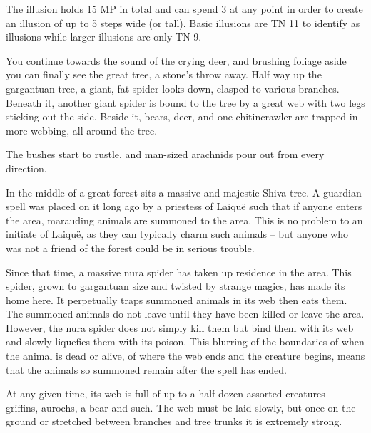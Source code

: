 \begin{multicols}{2}
The illusion holds 15 MP in total and can spend 3 at any point in order to create an illusion of up to 5 steps wide (or tall).
Basic illusions are TN 11 to identify as illusions while larger illusions are only TN 9.


\begin{boxtext}

  You continue towards the sound of the crying deer, and brushing foliage aside you can finally see the great tree, a stone's throw away.
  Half way up the gargantuan tree, a giant, fat spider looks down, clasped to various branches.
  Beneath it, another giant spider is bound to the tree by a great web with two legs sticking out the side.
  Beside it, bears, deer, and one chitincrawler are trapped in more webbing, all around the tree.

  The bushes start to rustle, and man-sized arachnids pour out from every direction.

\end{boxtext}

In the middle of a great forest sits a massive and majestic Shiva tree.
A guardian spell was placed on it long ago by a priestess of Laiqu\"{e} such that if anyone enters the area, marauding animals are summoned to the area.
This is no problem to an initiate of Laiqu\"{e}, as they can typically charm such animals -- but anyone who was not a friend of the forest could be in serious trouble.

Since that time, a massive nura spider has taken up residence in the area.  This spider, grown to gargantuan size and twisted by strange magics, has made its home here.  It perpetually traps summoned animals in its web then eats them.  The summoned animals do not leave until they have been killed or leave the area.  However, the nura spider does not simply kill them but bind them with its web and slowly liquefies them with its poison.  This blurring of the boundaries of when the animal is dead or alive, of where the web ends and the creature begins, means that the animals so summoned remain after the spell has ended.

At any given time, its web is full of up to a half dozen assorted creatures -- griffins, aurochs, a bear and such.
The web must be laid slowly, but once on the ground or stretched between branches and tree trunks it is extremely strong.



\end{multicols}
